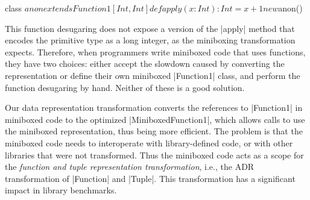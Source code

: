 \begin{lstlisting-nobreak}
class $anon extends Function1[Int, Int] {
  def apply(x: Int): Int = x + 1
}
new $anon()
\end{lstlisting-nobreak}

This function desugaring does not expose a version of the |apply| method that encodes the primitive type as a long integer, as the miniboxing transformation expects. Therefore, when programmers write miniboxed code that uses functions, they have two choices: either accept the slowdown caused by converting the representation or define their own miniboxed |Function1| class, and perform the function desugaring by hand. Neither of these is a good solution.


Our data representation transformation converts the references to
|Function1| in miniboxed code to the optimized |MiniboxedFunction1|,
which allows calls to use the miniboxed representation, thus being more efficient. The
problem is that the miniboxed code needs to interoperate with
library-defined code, or with other libraries that were not
transformed. Thus the miniboxed code acts
as a scope for the \emph{function and tuple representation
  transformation}, i.e., the ADR transformation of |Function| and
|Tuple|.
This transformation has a significant impact in library benchmarks.

